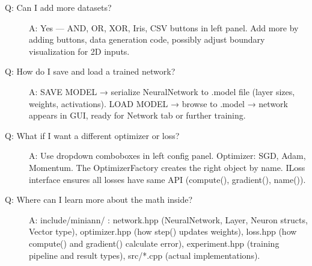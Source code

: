 \documentclass[12pt]{article}
\begin{document}
\begin{description}
\item[Q: Can I add more datasets?]
A: Yes — AND, OR, XOR, Iris, CSV buttons in left panel. Add more by adding buttons, data generation code, possibly adjust boundary visualization for 2D inputs.

\item[Q: How do I save and load a trained network?]
A: SAVE MODEL → serialize NeuralNetwork to .model file (layer sizes, weights, activations). LOAD MODEL → browse to .model → network appears in GUI, ready for Network tab or further training.

\item[Q: What if I want a different optimizer or loss?]
A: Use dropdown comboboxes in left config panel. Optimizer: SGD, Adam, Momentum. The OptimizerFactory creates the right object by name. ILoss interface ensures all losses have same API (compute(), gradient(), name()).

\item[Q: Where can I learn more about the math inside?]
A: include/miniann/ : network.hpp (NeuralNetwork, Layer, Neuron structs, Vector type), optimizer.hpp (how step() updates weights), loss.hpp (how compute() and gradient() calculate error), experiment.hpp (training pipeline and result types), src/*.cpp (actual implementations).
\end{description}
\end{document}
